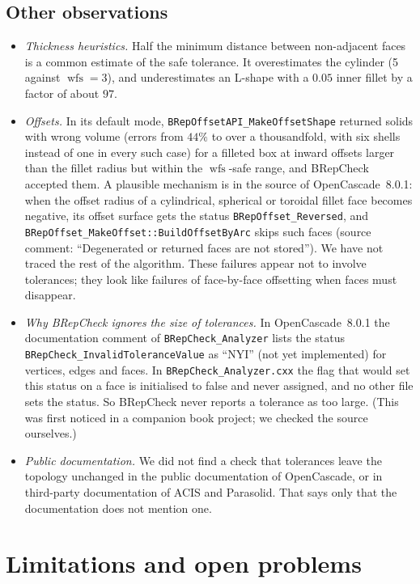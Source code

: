 \documentclass[preprint,12pt]{elsarticle}
\theoremstyle{definition}
\theoremstyle{remark}
\newcommand{\wfs}{\operatorname{wfs}}
\begin{document}
\subsection{Other observations}
\begin{itemize}
\item \emph{Thickness heuristics.} Half the minimum distance between non-adjacent faces is a common estimate of the
safe tolerance. It overestimates the cylinder (5 against $\wfs=3$), and underestimates an L-shape with a $0.05$
inner fillet by a factor of about $97$.
\item \emph{Offsets.} In its default mode, \texttt{BRepOffsetAPI\_MakeOffsetShape} returned solids with wrong
volume (errors from $44\%$ to over a thousandfold, with six shells instead of one in every such case) for a filleted box at
inward offsets larger than the fillet radius but within the $\wfs$-safe range, and BRepCheck accepted them. A plausible
mechanism is in the source of OpenCascade~8.0.1: when the offset radius of a cylindrical, spherical or toroidal fillet
face becomes negative, its offset
surface gets the status \texttt{BRepOffset\_Reversed}, and \texttt{BRepOffset\_MakeOffset::BuildOffsetByArc} skips
such faces (source comment: ``Degenerated or returned faces are not stored''). We have not traced the rest of the
algorithm. These failures appear not to involve tolerances; they look like failures of face-by-face offsetting when faces must
disappear.
\item \emph{Why BRepCheck ignores the size of tolerances.} In OpenCascade~8.0.1 the documentation comment of
\texttt{BRepCheck\_Analyzer} lists the status \texttt{BRepCheck\_InvalidToleranceValue} as ``NYI'' (not yet
implemented) for vertices, edges and faces. In \texttt{BRepCheck\_Analyzer.cxx} the flag that would set this status on a
face is initialised to false and never assigned, and no other file sets the status. So BRepCheck never reports a
tolerance as too large. (This was first noticed in a companion book project; we checked the source
ourselves.)
\item \emph{Public documentation.} We did not find a check that tolerances leave the topology unchanged in the
public documentation of OpenCascade, or in third-party documentation of ACIS and Parasolid. That says only that
the documentation does not mention one.
\end{itemize}

\section{Limitations and open problems}\label{sec:open}
\end{document}
